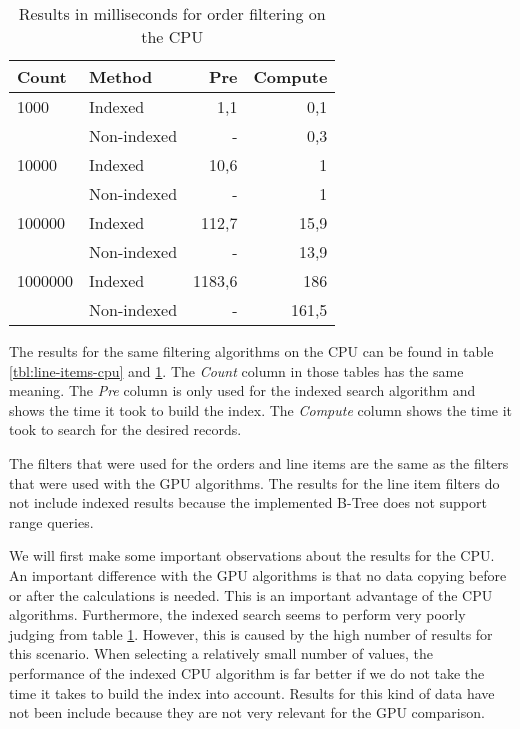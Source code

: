 \documentclass[a4paper,titlepage]{article}
\begin{document}
\begin{table}
\begin{tabular}{l l r r}
\toprule
\textbf{Count} & \textbf{Method} & \textbf{Pre} & \textbf{Compute}\\
\midrule
1000    & Indexed     & 1,1    & 0,1 \\
        & Non-indexed & -      & 0,3\\
10000   & Indexed     & 10,6   & 1 \\
        & Non-indexed & -      & 1 \\
100000  & Indexed     & 112,7  & 15,9 \\
        & Non-indexed & -      & 13,9 \\
1000000 & Indexed     & 1183,6 & 186 \\
        & Non-indexed & -      & 161,5 \\
\bottomrule
\end{tabular}
\caption{Results in milliseconds for order filtering on the CPU}
\label{tbl:orders-cpu}
\end{table}

The results for the same filtering algorithms on the CPU can be found in table \ref{tbl:line-items-cpu} and \ref{tbl:orders-cpu}. The \emph{Count} column in those tables has the same meaning. The \emph{Pre} column is only used for the indexed search algorithm and shows the time it took to build the index. The \emph{Compute} column shows the time it took to search for the desired records.

The filters that were used for the orders and line items are the same as the filters that were used with the GPU algorithms. The results for the line item filters do not include indexed results because the implemented B-Tree does not support range queries. 

We will first make some important observations about the results for the CPU. An important difference with the GPU algorithms is that no data copying before or after the calculations is needed. This is an important advantage of the CPU algorithms. Furthermore, the indexed search seems to perform very poorly judging from table \ref{tbl:orders-cpu}. However, this is caused by the high number of results for this scenario. When selecting a relatively small number of values, the performance of the indexed CPU algorithm is far better if we do not take the time it takes to build the index into account. Results for this kind of data have not been include because they are not very relevant for the GPU comparison.
\end{document}
